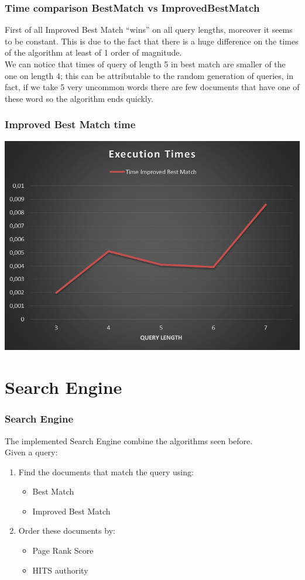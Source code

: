 \documentclass{beamer}
\begin{document}
\begin{frame}
\frametitle{Time comparison BestMatch vs ImprovedBestMatch}
First of all  Improved Best Match ``\alert{wins}'' on all query lengths, moreover it seems to be constant. This is due to the fact that there is a huge difference on the times of the algorithm at least of 1 order of magnitude.\\
\medskip
We can notice that times of query of length 5 in best match are smaller of the one on length 4; this can be attributable to the random generation of queries, in fact, if we take 5 very uncommon words there are \alert{few} documents that have one of these word so the algorithm ends quickly. 
\end{frame}

\begin{frame}
\frametitle{Improved Best Match time}
\begin{center}
\includegraphics[scale=0.32]{img/Matching/Tempi_IMP.PNG} 
\end{center}
\end{frame}

\section{Search Engine}
\begin{frame}
\frametitle{Search Engine}
The implemented Search Engine combine the algorithms seen before.\\ 
Given a query:
\begin{enumerate}
\item Find the documents that match the query using:
\begin{itemize}
\item Best Match
\item Improved Best Match
\end{itemize}
\item Order these documents by:
\begin{itemize}
\item Page Rank Score
\item HITS authority
\end{itemize}
\end{enumerate}
\end{frame}
\end{document}
